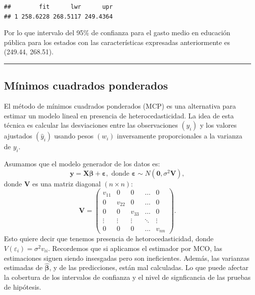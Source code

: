 \documentclass[
]{article}
\begin{document}
\begin{verbatim}
##        fit      lwr      upr
## 1 258.6228 268.5117 249.4364
\end{verbatim}

Por lo que intervalo del 95\% de confianza para el gasto medio en educación pública para los estados con las características expresadas anteriormente es (249.44, 268.51).

\rule{\textwidth}{0.4pt}

\hypertarget{muxednimos-cuadrados-ponderados}{%
\subsection{Mínimos cuadrados ponderados}\label{muxednimos-cuadrados-ponderados}}

El método de mínimos cuadrados ponderados (MCP) es una alternativa para estimar un modelo lineal en presencia de heterocedasticidad. La idea de esta técnica es calcular las desviaciones entre las observaciones \((y_{i})\) y los valores ajustados \((\widehat{y}_{i})\) usando pesos \((w_{i})\) inversamente proporcionales a la varianza de \(y_{i}\).

Asumamos que el modelo generador de los datos es:
\begin{equation}
\boldsymbol y= \boldsymbol X\boldsymbol \beta+ \boldsymbol \varepsilon, \mbox{ donde }\boldsymbol \varepsilon\sim N(\boldsymbol 0,\sigma^{2}\boldsymbol V),
\label{eq:modV}
\end{equation}
donde \(\boldsymbol V\) es una matriz diagonal \((n \times n)\):
\[
\boldsymbol V= \begin{pmatrix}
v_{11} & 0 & 0 & \ldots & 0 \\
0 & v_{22} & 0 & \ldots & 0 \\
0 & 0 & v_{33} & \ldots & 0 \\
\vdots & \vdots & \vdots & \ddots & \vdots \\
0 & 0 & 0 & \ldots & v_{nn}
\end{pmatrix}.
\]
Esto quiere decir que tenemos presencia de hetorocedasticidad, donde \(V(\varepsilon_{i}) = \sigma^{2}v_{ii}\). Recordemos que si aplicamos el estimador por MCO, las estimaciones siguen siendo insesgadas pero son ineficientes. Además, las varianzas estimadas de \(\widehat{\boldsymbol \beta}\), y de las predicciones, están mal calculadas. Lo que puede afectar la cobertura de los intervalos de confianza y el nivel de signficancia de las pruebas de hipótesis.
\end{document}
